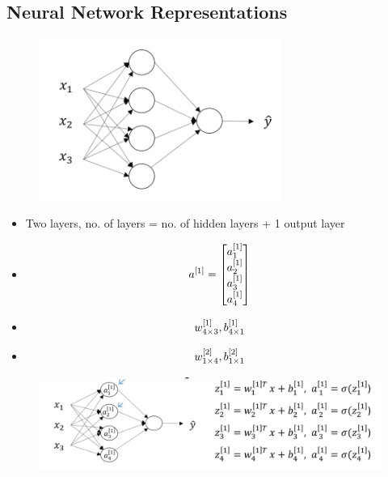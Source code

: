 \subsection{Neural Network Representations}
\begin{figure}[h]
\includegraphics[width=8cm]{images/representation.png}
\centering
\end{figure}
\begin{itemize}
	\item Two layers, no. of layers = no. of hidden layers + 1 output layer
	\item $$a^{[1]} = 
	\begin{bmatrix}
		a^{[1]}_1\\
		a^{[1]}_2\\
		a^{[1]}_3\\
		a^{[1]}_4
	\end{bmatrix}
	$$
	\item $$w^{[1]}_{4\times 3}, b^{[1]}_{4\times 1}$$
	\item $$w^{[2]}_{1\times 4}, b^{[2]}_{1\times 1}$$
\end{itemize}
\begin{figure}[h]
\includegraphics[scale=0.2]{images/representation2.png}
\centering
\end{figure}
